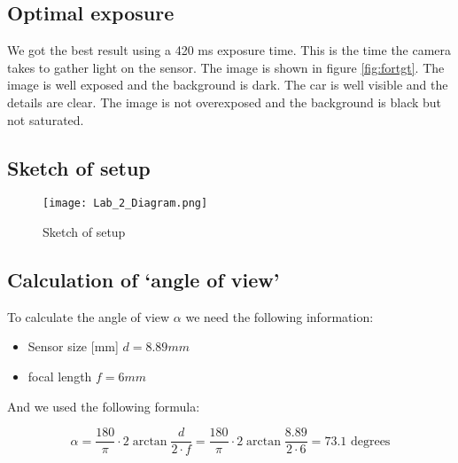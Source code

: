 \subsection{Optimal exposure}

We got the best result using a 420 ms exposure time. This is the time the camera takes to gather light on the sensor. The image is shown in figure \ref{fig:fortgt}. The image is well exposed and the background is dark. The car is well visible and the details are clear. The image is not overexposed and the background is black but not saturated. 

\subsection{Sketch of setup}
\label{sec:sketch}

\begin{figure}[H]
    \centering
    \texttt{[image: Lab\_2\_Diagram.png]}
    \caption{Sketch of setup}
    \label{fig:sketch}
\end{figure}

\subsection{Calculation of ‘angle of view’}
\label{sec:angle_of_view}





To calculate the angle of view $ \alpha $ we need the following information:

\begin{itemize}
    \item Sensor size [mm] $ d = 8.89 mm $
    \item focal length $ f = 6 mm $
\end{itemize}

And we used the following formula:

$$ \alpha = \frac{180}{\pi} \cdot 2\arctan{\frac{d}{2 \cdot f}} = \frac{180}{\pi} \cdot 2\arctan{\frac{8.89}{2 \cdot 6}} = 73.1 \text{ degrees} $$
